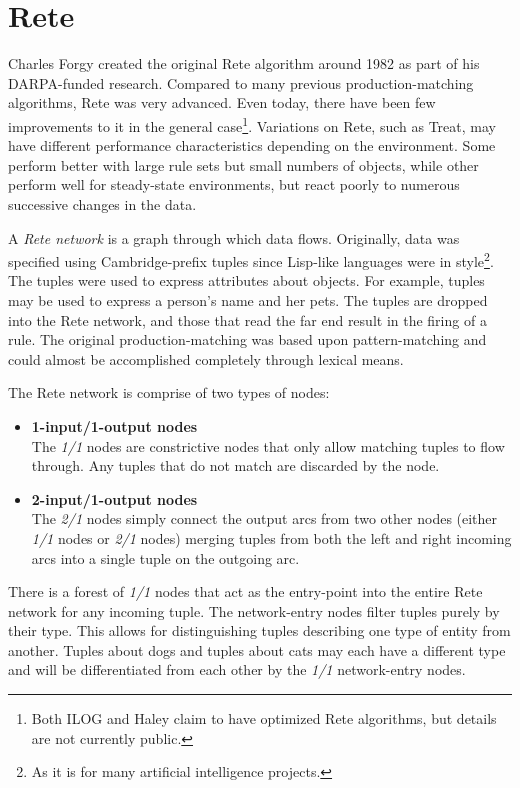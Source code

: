 \section{Rete}
\label{algo.rete}

Charles Forgy created the original Rete algorithm\cite{forgy82rete} 
around 1982 as part
of his DARPA-funded research.  Compared to many previous
production-matching algorithms, Rete was very advanced.  Even today,
there have been few improvements to it in the general
case\footnote{Both ILOG and Haley claim to have optimized Rete
algorithms, but details are not currently public.}.  Variations on 
Rete, such as Treat, may have different performance characteristics
depending on the environment.  Some perform better with large rule 
sets but small numbers of objects, while other perform well for 
steady-state environments, but react poorly to numerous successive 
changes in the data.

A \emph{Rete network} is a graph through which data flows.
Originally, data was specified using Cambridge-prefix tuples since
Lisp-like languages were in style\footnote{As it is for many artificial
intelligence projects.}.  The tuples were used to express attributes
about objects.  For example, tuples may be used to express a person's
name and her pets.  The tuples are dropped into the Rete network,
and those that read the far end result in the firing of a rule.
The original production-matching was based upon pattern-matching and
could almost be accomplished completely through lexical means.

The Rete network is comprise of two types of nodes:

\begin{itemize}
	\item \textbf{\textsf{1-input/1-output nodes}}\\
		The \emph{1/1} nodes are
		constrictive nodes that only allow matching tuples to
		flow through.  Any tuples that do not match are discarded
		by the node.
	\item \textbf{\textsf{2-input/1-output nodes}}\\
		The \emph{2/1} nodes simply connect the output arcs from two
		other nodes (either \emph{1/1} nodes or \emph{2/1} nodes) merging
		tuples from both the left and right incoming arcs
		into a single tuple on the outgoing arc.
\end{itemize}

There is a forest of \emph{1/1} nodes that act as the entry-point
into the entire Rete network for any incoming tuple.  The
network-entry  nodes filter tuples purely by their type.  
This allows for distinguishing tuples describing one type of 
entity from another.  Tuples about dogs and tuples about cats may 
each have a different type and will be differentiated from each 
other by the \emph{1/1} network-entry nodes.

